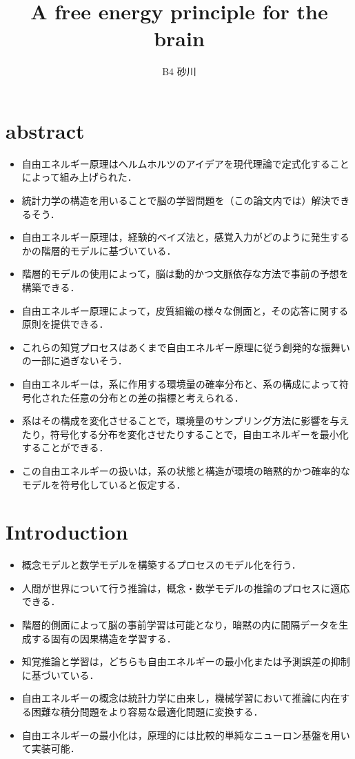 \documentclass[a4paper]{jsarticle}
\title{\Huge A free energy principle for the brain}
\author{B4 砂川}
\begin{document}
\maketitle

\section{abstract}
\begin{itemize}
    \item 自由エネルギー原理はヘルムホルツのアイデアを現代理論で定式化することによって組み上げられた．
    \item 統計力学の構造を用いることで脳の学習問題を（この論文内では）解決できるそう．
    \item 自由エネルギー原理は，経験的ベイズ法と，感覚入力がどのように発生するかの階層的モデルに基づいている．
    \item 階層的モデルの使用によって，脳は動的かつ文脈依存な方法で事前の予想を構築できる．
    \item 自由エネルギー原理によって，皮質組織の様々な側面と，その応答に関する原則を提供できる．
    \item これらの知覚プロセスはあくまで自由エネルギー原理に従う創発的な振舞いの一部に過ぎないそう．
    \item 自由エネルギーは，系に作用する環境量の確率分布と、系の構成によって符号化された任意の分布との差の指標と考えられる．
    \item 系はその構成を変化させることで，環境量のサンプリング方法に影響を与えたり，符号化する分布を変化させたりすることで，自由エネルギーを最小化することができる．
    \item この自由エネルギーの扱いは，系の状態と構造が環境の暗黙的かつ確率的なモデルを符号化していると仮定する．
\end{itemize}

\section{Introduction}
\begin{itemize}
    \item 概念モデルと数学モデルを構築するプロセスのモデル化を行う．
    \item 人間が世界について行う推論は，概念・数学モデルの推論のプロセスに適応できる．
    \item 階層的側面によって脳の事前学習は可能となり，暗黙の内に間隔データを生成する固有の因果構造を学習する．
    \item 知覚推論と学習は，どちらも自由エネルギーの最小化または予測誤差の抑制に基づいている．
    \item 自由エネルギーの概念は統計力学に由来し，機械学習において推論に内在する困難な積分問題をより容易な最適化問題に変換する．
    \item 自由エネルギーの最小化は，原理的には比較的単純なニューロン基盤を用いて実装可能．
\end{itemize}
\end{document}
